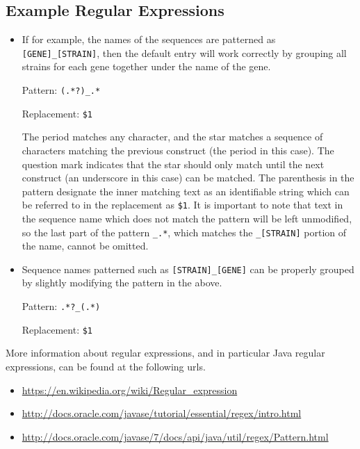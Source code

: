 \documentclass[12pt,letterpaper]{article}
\begin{document}
\subsection{Example Regular Expressions}

\begin{itemize}
\item
    If for example, the names of the sequences are patterned as
    \texttt{[GENE]\_[STRAIN]}, then the default entry will work correctly by
    grouping all strains for each gene together under the name of the gene.

    Pattern: \texttt{(.*?)\_.*}

    Replacement: \texttt{\$1}

    The period matches any character, and the star matches a sequence of
    characters matching the previous construct (the period in this case).  The
    question mark indicates that the star should only match until the next
    construct (an underscore in this case) can be matched.  The parenthesis in
    the pattern designate the inner matching text as an identifiable string
    which can be referred to in the replacement as \texttt{\$1}.  It is
    important to note that text in the sequence name which does not match the
    pattern will be left unmodified, so the last part of the pattern
    \texttt{\_.*}, which matches the \texttt{\_[STRAIN]} portion of the name,
    cannot be omitted.

\item
    Sequence names patterned such as \texttt{[STRAIN]\_[GENE]} can be properly
    grouped by slightly modifying the pattern in the above.

    Pattern: \texttt{.*?\_(.*)}

    Replacement: \texttt{\$1}

\end{itemize}

More information about regular expressions, and in particular Java regular
expressions, can be found at the following urls.

\begin{itemize}
\item
    \url{https://en.wikipedia.org/wiki/Regular\_expression}
\item
    \url{http://docs.oracle.com/javase/tutorial/essential/regex/intro.html}
\item
    \url{http://docs.oracle.com/javase/7/docs/api/java/util/regex/Pattern.html}
\end{itemize}
\end{document}
